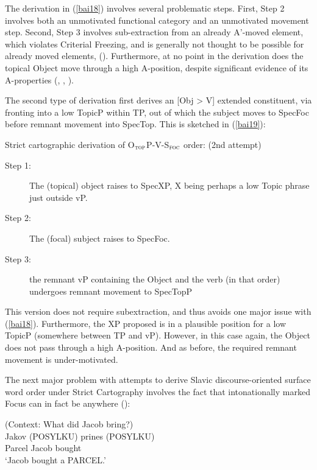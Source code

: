 \documentclass[output=paper]{langscibook}
\begin{document}
The derivation in (\ref{bai18}) involves several problematic steps. First, Step 2 involves both an unmotivated functional category and an unmotivated movement step. Second, Step 3 involves sub-extraction from an already A’-moved element, which violates \citealt{Rizzi2004} Criterial Freezing, and is generally not thought to be possible for already moved elements, (\citealt{Stepanov2007}). Furthermore, at no point in the derivation does the topical Object move through a high A-position, despite significant evidence of its A-properties (\citealt{Bailyn2004}, \citealt{Antonyuk2021}, \citealt{Pereltsvaig2021}).

The second type of derivation first derives an [Obj > V] extended constituent, via fronting into a low TopicP within TP, out of which the subject moves to SpecFoc before remnant movement into SpecTop.  This is sketched in (\ref{bai19}): 

\begin{exe}
\ex \label{bai19}
Strict cartographic derivation of O$_{\textsc{top}}$P-V-S$_{\textsc{foc}}$ order: (2nd attempt)
\begin{description}
\item[Step 1:]  The (topical) object raises to SpecXP, X being perhaps a low Topic phrase just outside vP.
\item[Step 2:]  The (focal) subject raises to SpecFoc.
\item[Step 3:]  the remnant vP containing the Object and the verb (in that order) undergoes remnant movement to SpecTopP
\end{description}
\end{exe}

This version does not require subextraction, and thus avoids one major issue with (\ref{bai18}). Furthermore, the XP proposed is in a plausible position for a low TopicP (somewhere between TP and vP). However, in this case again, the Object does not pass through a high A-position. And as before, the required remnant movement is under-motivated. 

The next major problem with attempts to derive Slavic discourse-oriented surface word order under Strict Cartography involves the fact that intonationally marked Focus can in fact be anywhere (\citealt{Bailyn2012}):

\begin{exe}
\ex \label{bai20}
(Context: What did Jacob bring?) \\
	{Jakov}	{(POSYLKU)} {prines} {(POSYLKU)} \\ 
Parcel Jacob {} bought \\
\glt `Jacob bought a PARCEL.'\\
\end{exe}
\end{document}
